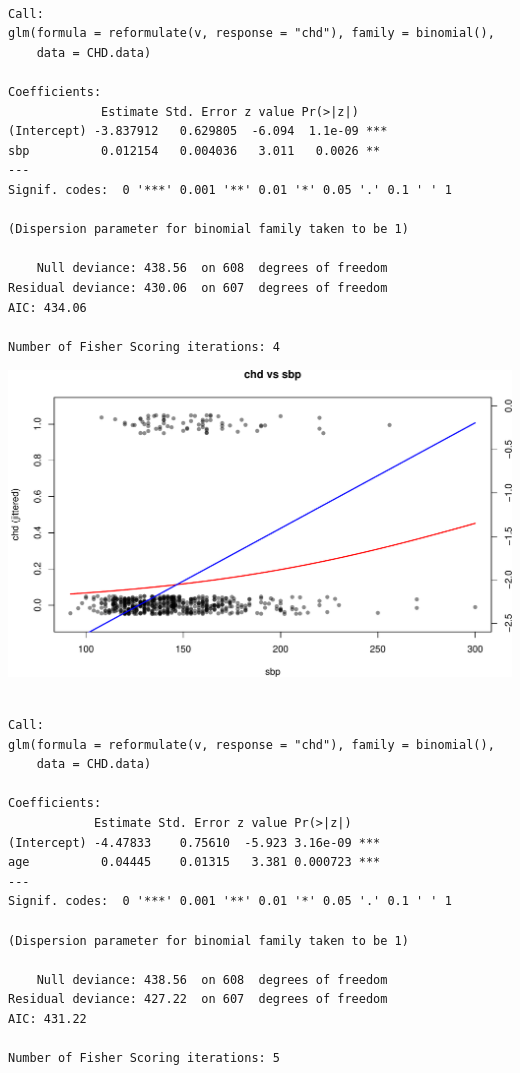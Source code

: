 \documentclass[
  letterpaper,
]{scrbook}
\begin{document}
\begin{verbatim}

Call:
glm(formula = reformulate(v, response = "chd"), family = binomial(), 
    data = CHD.data)

Coefficients:
             Estimate Std. Error z value Pr(>|z|)    
(Intercept) -3.837912   0.629805  -6.094  1.1e-09 ***
sbp          0.012154   0.004036   3.011   0.0026 ** 
---
Signif. codes:  0 '***' 0.001 '**' 0.01 '*' 0.05 '.' 0.1 ' ' 1

(Dispersion parameter for binomial family taken to be 1)

    Null deviance: 438.56  on 608  degrees of freedom
Residual deviance: 430.06  on 607  degrees of freedom
AIC: 434.06

Number of Fisher Scoring iterations: 4
\end{verbatim}

\includegraphics{unit4-lr/logistic_files/figure-pdf/chd-univariate-2x2-jitter-fixedlogit-2.pdf}

\begin{verbatim}

Call:
glm(formula = reformulate(v, response = "chd"), family = binomial(), 
    data = CHD.data)

Coefficients:
            Estimate Std. Error z value Pr(>|z|)    
(Intercept) -4.47833    0.75610  -5.923 3.16e-09 ***
age          0.04445    0.01315   3.381 0.000723 ***
---
Signif. codes:  0 '***' 0.001 '**' 0.01 '*' 0.05 '.' 0.1 ' ' 1

(Dispersion parameter for binomial family taken to be 1)

    Null deviance: 438.56  on 608  degrees of freedom
Residual deviance: 427.22  on 607  degrees of freedom
AIC: 431.22

Number of Fisher Scoring iterations: 5
\end{verbatim}
\end{document}
